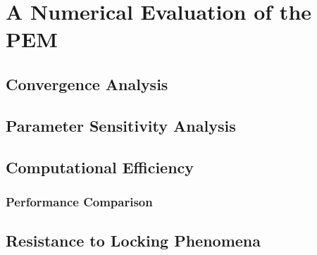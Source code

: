 \chapter{A Numerical Evaluation of the PEM} \label{ch:results}
%
\section{Convergence Analysis}

\section{Parameter Sensitivity Analysis}

\section{Computational Efficiency}
\subsection{Performance Comparison}

\section{Resistance to Locking Phenomena}
